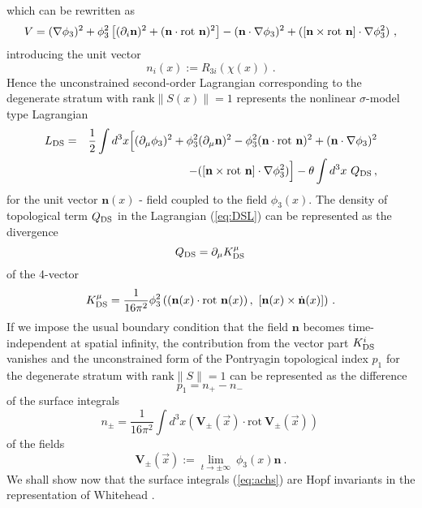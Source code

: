\documentclass[a4paper,12pt]{article}
\newcommand{\nn}{\nonumber}
\begin{document}
which can be rewritten as \cite{KP,ErrKP}
\begin{equation}
\label{V22}
V= (\nabla \phi_3)^2
+ \phi_3^2\left[(\partial_i{\mathbf{n}})^2+ (\mathbf{n}\cdot
{\rm rot}{\ \mathbf{n}})^2\right]
 -(\mathbf{n} \cdot \nabla \phi_3)^2
+ ([\mathbf{n} \times \mbox{rot\ } \mathbf{n} ] \cdot \nabla \phi_3^2)~,
\end{equation}
introducing the unit vector
\begin{equation}
n_i(x):=R_{3i}(\chi(x))\,.
\end{equation}
Hence the unconstrained second-order Lagrangian
corresponding to the degenerate stratum   with $\mbox{rank}\|S(x)\| = 1$
represents  the nonlinear $\sigma$-model type Lagrangian
\begin{eqnarray}
\label{eq:DSL}
L_{\rm DS} &=&
{1\over 2}\int d^3x
\Big[(\partial_\mu \phi_3)^2+  \phi_3^2(\partial_\mu \mathbf{n})^2-
 \phi_3^2(\mathbf{n}\cdot{\rm rot}{\ \mathbf{n}})^2
 +(\mathbf{n} \cdot \nabla \phi_3)^2\nn\\
&&\ \ \ \ \ \ \ \ \ \ \ \ \
- ([\mathbf{n} \times \mbox{rot\ } \mathbf{n} ] \cdot \nabla \phi_3^2)\Big]
-\theta\int d^3x\,\, Q_{\rm DS}\,,
\end{eqnarray}
for the unit vector $\mathbf{n}(x)$ - field  coupled to the field $\phi_3(x)$.
The density of topological term $Q_{\rm DS}$ in the Lagrangian (\ref{eq:DSL})
can be represented as the divergence
\begin{equation}
Q_{\rm DS} = \partial_\mu K_{\rm DS}^\mu\,
\end{equation}
of the 4-vector
\begin{equation}
K_{\rm DS}^\mu = \frac{1}{16\pi^2}\phi_3^2 \left(  (\mathbf{n}(x)
\cdot \mbox{rot}\
\mathbf{n}(x))\,, \
[\mathbf{n}(x) \times \dot{\mathbf{n}}(x)] \right)\,.
\end{equation}
If we impose the usual boundary condition that the field ${\mathbf{n}}$
becomes time-independent at spatial infinity,  the contribution from the
vector part  $K_{\rm DS}^i$ vanishes and
the unconstrained form of the Pontryagin topological index $p_1$
for the degenerate stratum with $\mbox{rank}\|S\|=1$ can be represented
as the difference
\begin{equation}
p_1 = n_+  - n_-\,
\end{equation}
of the surface integrals
\begin{equation}
\label{eq:achs}
n_{\pm} = \frac{1}{16\pi^2}\int d^3x
\left( {\mathbf{V}}_{\pm}(\vec{x})\cdot \mbox{rot}\
{\mathbf{V}}_{\pm} (\vec{x}) \right)\,
\end{equation}
of the fields
\begin{equation}
{\mathbf{V}}_{\pm}(\vec{x}) := \lim_{t \to \pm \infty}\ \phi_3(x){\mathbf{n}} ~.
\end{equation}
We shall show now that the surface integrals (\ref{eq:achs}) are
Hopf invariants in the representation of Whitehead \cite{Whitehead}.
\end{document}
